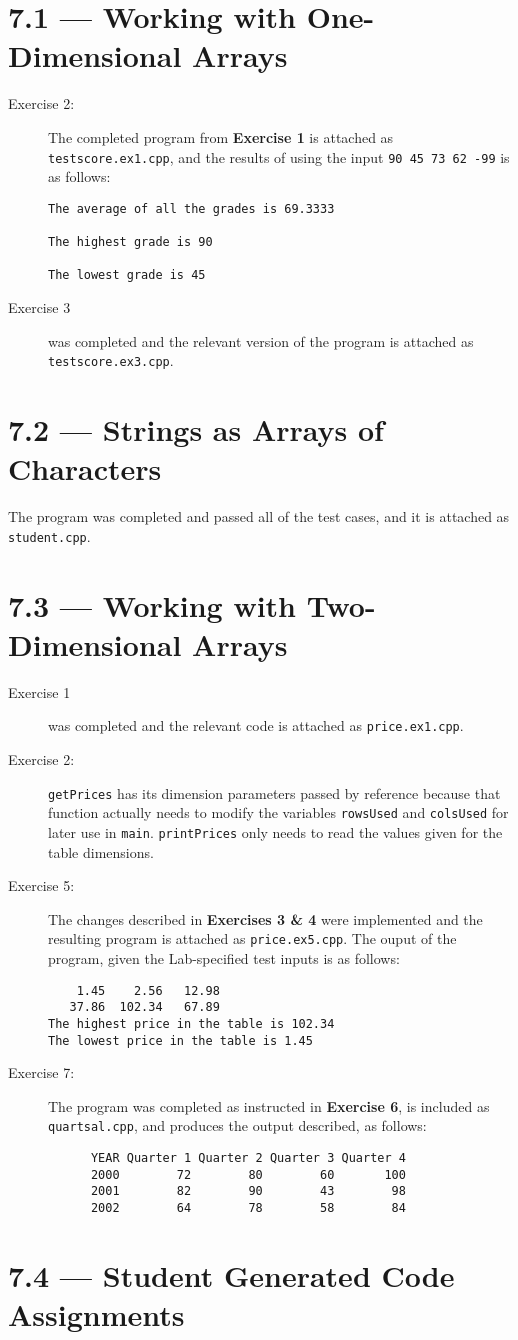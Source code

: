 \documentclass[11pt]{article}
\begin{document}
\section*{7.1 --- Working with One-Dimensional Arrays}
\begin{description}
    \item[Exercise 2:] The completed program from \textbf{Exercise 1} is attached as \texttt{testscore.ex1.cpp}, and the results of using the input \texttt{90 45 73 62 -99} is as follows: \begin{verbatim}
The average of all the grades is 69.3333

The highest grade is 90

The lowest grade is 45
    \end{verbatim}
    \item[Exercise 3] was completed and the relevant version of the program is attached as \texttt{testscore.ex3.cpp}.
\end{description}

\section*{7.2 --- Strings as Arrays of Characters}
    The program was completed and passed all of the test cases, and it is attached as \texttt{student.cpp}.

\section*{7.3 --- Working with Two-Dimensional Arrays}
\begin{description}
    \item[Exercise 1] was completed and the relevant code is attached as \texttt{price.ex1.cpp}.
    \item[Exercise 2:] \lstinline{getPrices} has its dimension parameters passed by reference because that function actually needs to modify the variables \lstinline{rowsUsed} and \lstinline{colsUsed} for later use in \lstinline{main}. \lstinline{printPrices} only needs to read the values given for the table dimensions.
    \item[Exercise 5:] The changes described in \textbf{Exercises 3 \& 4} were implemented and the resulting program is attached as \texttt{price.ex5.cpp}. The ouput of the program, given the Lab-specified test inputs is as follows: \begin{verbatim}
    1.45    2.56   12.98
   37.86  102.34   67.89
The highest price in the table is 102.34
The lowest price in the table is 1.45
\end{verbatim}
    \item[Exercise 7:] The program was completed as instructed in \textbf{Exercise 6}, is included as \texttt{quartsal.cpp}, and produces the output described, as follows: \begin{verbatim}
      YEAR Quarter 1 Quarter 2 Quarter 3 Quarter 4
      2000        72        80        60       100
      2001        82        90        43        98
      2002        64        78        58        84
\end{verbatim}
\end{description}

\section*{7.4 --- Student Generated Code Assignments}
\end{document}
